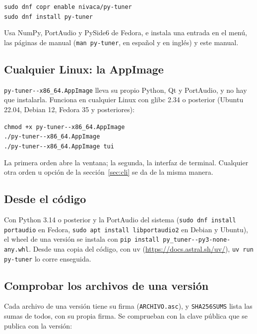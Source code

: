 \documentclass[12pt,
              article,
              oneside
              ]{memoir}
\renewenvironment{quote}%
 {\begin{list}{}%
              {\setlength\rightmargin{0pt}%
              \setlength\leftmargin{\parindent}}%
  \item[]\small\ignorespaces}
 {\unskip\end{list}}
\begin{document}
\begin{quote}
\texttt{sudo dnf copr enable nivaca/py-tuner}\\
\texttt{sudo dnf install py-tuner}
\end{quote}

\noindent Usa NumPy, PortAudio y PySide6 de Fedora, e instala una entrada
en el menú, las páginas de manual (\texttt{man py-tuner}, en español y en
inglés) y este manual.

\subsection{Cualquier Linux: la AppImage}

%
\texttt{py-tuner-\version-x86\_64.AppImage} lleva su propio Python, Qt y
PortAudio, y no hay que instalarla. Funciona en cualquier Linux con glibc
2.34 o posterior (Ubuntu 22.04, Debian 12, Fedora 35 y posteriores):

\begin{quote}
\texttt{chmod +x py-tuner-\version-x86\_64.AppImage}\\
\texttt{./py-tuner-\version-x86\_64.AppImage}\\
\texttt{./py-tuner-\version-x86\_64.AppImage tui}
\end{quote}

\noindent La primera orden abre la ventana; la segunda, la interfaz de
terminal. Cualquier otra orden u opción de la sección~\ref{sec:cli} se da
de la misma manera.

\subsection{Desde el código}

%
Con Python 3.14 o posterior y la PortAudio del sistema (\texttt{sudo dnf
install portaudio} en Fedora, \texttt{sudo apt install libportaudio2} en
Debian y Ubuntu), el wheel de una versión se instala con \texttt{pip
install py\_tuner-\version-py3-none-any.whl}. Desde una copia del código,
con uv (\url{https://docs.astral.sh/uv/}), \texttt{uv run py-tuner} lo
corre enseguida.

\subsection{Comprobar los archivos de una versión}
\label{sec:signatures}

%
Cada archivo de una versión tiene su firma (\texttt{ARCHIVO.asc}), y
\texttt{SHA256SUMS} lista las sumas de todos, con su propia firma. Se
comprueban con la clave pública que se publica con la versión:
\end{document}
